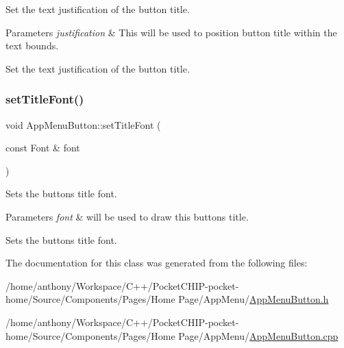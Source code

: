 Set the text justification of the button title.


\begin{DoxyParams}{Parameters}
{\em justification} & This will be used to position button title within the text bounds.\\
\hline
\end{DoxyParams}
Set the text justification of the button title. \mbox{\label{classAppMenuButton_ab3368972b9d659cad06cc95586b4a63c}} 
\subsubsection{\texorpdfstring{set\+Title\+Font()}{setTitleFont()}}
{\footnotesize\ttfamily void App\+Menu\+Button\+::set\+Title\+Font (\begin{DoxyParamCaption}\item[{const Font \&}]{font }\end{DoxyParamCaption})\hspace{0.3cm}{\ttfamily [protected]}}

Sets the button\textquotesingle{}s title font.


\begin{DoxyParams}{Parameters}
{\em font} & will be used to draw this button\textquotesingle{}s title.\\
\hline
\end{DoxyParams}
Sets the button\textquotesingle{}s title font. 

The documentation for this class was generated from the following files\+:\begin{DoxyCompactItemize}
\item 
/home/anthony/\+Workspace/\+C++/\+Pocket\+C\+H\+I\+P-\/pocket-\/home/\+Source/\+Components/\+Pages/\+Home Page/\+App\+Menu/\mbox{\hyperlink{AppMenuButton_8h}{App\+Menu\+Button.\+h}}\item 
/home/anthony/\+Workspace/\+C++/\+Pocket\+C\+H\+I\+P-\/pocket-\/home/\+Source/\+Components/\+Pages/\+Home Page/\+App\+Menu/\mbox{\hyperlink{AppMenuButton_8cpp}{App\+Menu\+Button.\+cpp}}\end{DoxyCompactItemize}
